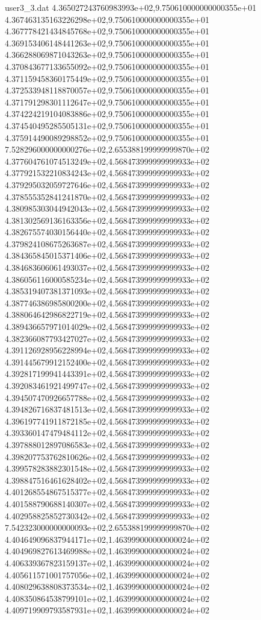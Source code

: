 \begin{filecontents}{user3_3.dat}
4.365027243760983993e+02,9.750610000000000355e+01
4.367463135163226298e+02,9.750610000000000355e+01
4.367778421434845768e+02,9.750610000000000355e+01
4.369153406148441263e+02,9.750610000000000355e+01
4.366288069871043263e+02,9.750610000000000355e+01
4.370843677133655092e+02,9.750610000000000355e+01
4.371159458360175449e+02,9.750610000000000355e+01
4.372533948118870057e+02,9.750610000000000355e+01
4.371791298301112647e+02,9.750610000000000355e+01
4.374224219104083886e+02,9.750610000000000355e+01
4.374540495285505131e+02,9.750610000000000355e+01
4.375914490089298852e+02,9.750610000000000355e+01
7.528296000000000276e+02,2.655388199999999870e+02
4.377604761074513249e+02,4.568473999999999933e+02
4.377921532210834243e+02,4.568473999999999933e+02
4.379295032059727646e+02,4.568473999999999933e+02
4.378555352841241870e+02,4.568473999999999933e+02
4.380985303044942043e+02,4.568473999999999933e+02
4.381302569136163356e+02,4.568473999999999933e+02
4.382675574030156440e+02,4.568473999999999933e+02
4.379824108675263687e+02,4.568473999999999933e+02
4.384365845015371406e+02,4.568473999999999933e+02
4.384683606061493037e+02,4.568473999999999933e+02
4.386056116000585234e+02,4.568473999999999933e+02
4.385319407381371093e+02,4.568473999999999933e+02
4.387746386985800200e+02,4.568473999999999933e+02
4.388064642986822719e+02,4.568473999999999933e+02
4.389436657971014029e+02,4.568473999999999933e+02
4.382366087793427027e+02,4.568473999999999933e+02
4.391126928956228994e+02,4.568473999999999933e+02
4.391445679912152400e+02,4.568473999999999933e+02
4.392817199941443391e+02,4.568473999999999933e+02
4.392083461921499747e+02,4.568473999999999933e+02
4.394507470926657788e+02,4.568473999999999933e+02
4.394826716837481513e+02,4.568473999999999933e+02
4.396197741911872185e+02,4.568473999999999933e+02
4.393360147479484112e+02,4.568473999999999933e+02
4.397888012897086583e+02,4.568473999999999933e+02
4.398207753762810626e+02,4.568473999999999933e+02
4.399578283882301548e+02,4.568473999999999933e+02
4.398847516461628402e+02,4.568473999999999933e+02
4.401268554867515377e+02,4.568473999999999933e+02
4.401588790688140307e+02,4.568473999999999933e+02
4.402958825852730342e+02,4.568473999999999933e+02
7.542323000000000093e+02,2.655388199999999870e+02
4.404649096837944171e+02,1.463999000000000024e+02
4.404969827613469988e+02,1.463999000000000024e+02
4.406339367823159137e+02,1.463999000000000024e+02
4.405611571001757056e+02,1.463999000000000024e+02
4.408029638808373534e+02,1.463999000000000024e+02
4.408350864538799101e+02,1.463999000000000024e+02
4.409719909793587931e+02,1.463999000000000024e+02

\end{filecontents}
